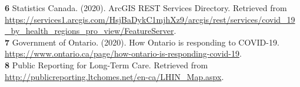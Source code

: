 \documentclass{article}
\begin{document}
\textbf{6} Statistics Canada. (2020). ArcGIS REST Services Directory. Retrieved from \href{https://services1.arcgis.com/HsjBaDykC1mjhXz9/arcgis/rest/services/covid_19_by_health_regions_pro_view/FeatureServer}{https://services1.arcgis.com/HsjBaDykC1mjhXz9/arcgis/rest/services/covid\_19\_by\_health\_regions\_pro\_view/FeatureServer}.\\

\textbf{7} Government of Ontario. (2020). How Ontario is responding to COVID-19. \href{https://www.ontario.ca/page/how-ontario-is-responding-covid-19 }{https://www.ontario.ca/page/how-ontario-is-responding-covid-19}.\\

\textbf{8} Public Reporting for Long-Term Care. Retrieved from \href{http://publicreporting.ltchomes.net/en-ca/LHIN_Map.aspx}{http://publicreporting.ltchomes.net/en-ca/LHIN_Map.aspx}. \\



\end{document}
